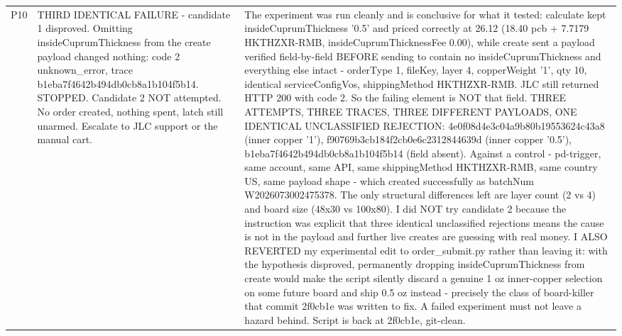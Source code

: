 \documentclass[11pt,a4paper]{article}
\begin{document}
{\begin{longtable}{lp{5.2cm}p{7.2cm}}
P10 & THIRD IDENTICAL FAILURE - candidate 1 disproved. Omitting insideCuprumThickness from the create payload changed nothing: code 2 unknown\_error, trace b1eba7f4642b494db0cb8a1b104f5b14. STOPPED. Candidate 2 NOT attempted. No order created, nothing spent, latch still unarmed. Escalate to JLC support or the manual cart. & The experiment was run cleanly and is conclusive for what it tested: calculate kept insideCuprumThickness '0.5' and priced correctly at 26.12 (18.40 pcb + 7.7179 HKTHZXR-RMB, insideCuprumThicknessFee 0.00), while create sent a payload verified field-by-field BEFORE sending to contain no insideCuprumThickness and everything else intact - orderType 1, fileKey, layer 4, copperWeight '1', qty 10, identical serviceConfigVos, shippingMethod HKTHZXR-RMB. JLC still returned HTTP 200 with code 2. So the failing element is NOT that field. THREE ATTEMPTS, THREE TRACES, THREE DIFFERENT PAYLOADS, ONE IDENTICAL UNCLASSIFIED REJECTION: 4e0f08d4e3c04a9b80b19553624c43a8 (inner copper '1'), f90769b3cb184f2cb0e6c2312844639d (inner copper '0.5'), b1eba7f4642b494db0cb8a1b104f5b14 (field absent). Against a control - pd-trigger, same account, same API, same shippingMethod HKTHZXR-RMB, same country US, same payload shape - which created successfully as batchNum W2026073002475378. The only structural differences left are layer count (2 vs 4) and board size (48x30 vs 100x80). I did NOT try candidate 2 because the instruction was explicit that three identical unclassified rejections means the cause is not in the payload and further live creates are guessing with real money. I ALSO REVERTED my experimental edit to order\_submit.py rather than leaving it: with the hypothesis disproved, permanently dropping insideCuprumThickness from create would make the script silently discard a genuine 1 oz inner-copper selection on some future board and ship 0.5 oz instead - precisely the class of board-killer that commit 2f0cb1e was written to fix. A failed experiment must not leave a hazard behind. Script is back at 2f0cb1e, git-clean. \\

\end{longtable}}
\end{document}
